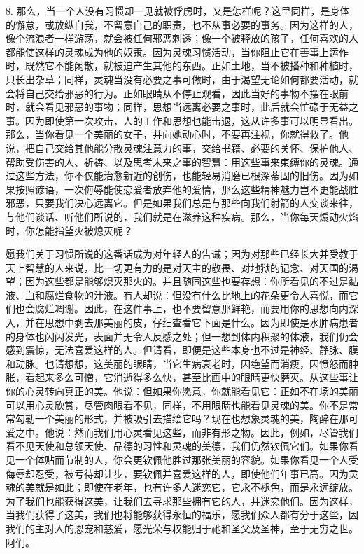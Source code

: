 8. 那么，当一个人没有习惯却一见就被俘虏时，又是怎样呢？这里同样，是身体的懈怠，或放纵自我，不留意自己的职责，也不从事必要的事务。因为这样的人，像个流浪者一样游荡，就会被任何邪恶刺透；像一个被释放的孩子，任何喜欢的人都能使这样的灵魂成为他的奴隶。因为灵魂习惯活动，当你阻止它在善事上运作时，既然它不能闲散，就被迫产生其他的东西。正如土地，当不被播种和种植时，只长出杂草；同样，灵魂当没有必要之事可做时，由于渴望无论如何都要活动，就会将自己交给邪恶的行为。正如眼睛从不停止观看，因此当好的事物不摆在眼前时，就会看见邪恶的事物；同样，思想当远离必要之事时，此后就会忙碌于无益之事。因为即使第一次攻击，人的工作和思想也能击退，这从许多事可以明显看出。那么，当你看见一个美丽的女子，并向她动心时，不要再注视，你就得救了。他说，把自己交给其他能分散灵魂注意力的事，交给书籍、必要的关怀、保护他人、帮助受伤害的人、祈祷、以及思考未来之事的智慧：用这些事来束缚你的灵魂。通过这些方法，你不仅能治愈新近的创伤，也能轻易消磨已根深蒂固的旧伤。因为如果按照谚语，一次侮辱能使恋爱者放弃他的爱情，那么这些精神魅力岂不更能战胜邪恶，只要我们决心远离它。但是如果我们总是与那些向我们射箭的人交谈来往，与他们谈话、听他们所说的，我们就是在滋养这种疾病。那么，当你每天煽动火焰时，你怎能指望火被熄灭呢？\par

愿我们关于习惯所说的这番话成为对年轻人的告诫；因为对那些已经长大并受教于天上智慧的人来说，比一切更有力的是对天主的敬畏、对地狱的记念、对天国的渴望；因为这些都是能够熄灭那火的。并且随同这些也要存想：你所看见的不过是黏液、血和腐烂食物的汁液。有人却说：但没有什么比地上的花朵更令人喜悦，而它们也会腐烂凋谢。因此，在这件事上，也不要留意那鲜艳，而要用你的思想向内深入，并在思想中剥去那美丽的皮，仔细查看它下面是什么。因为即使是水肿病患者的身体也闪闪发光，表面并无令人反感之处；但一想到体内积聚的体液，我们仍会感到震惊，无法喜爱这样的人。但请看，即便是这些本身也不过是神经、静脉、膜和动脉。也请想想，这美丽的眼睛，当它生病衰老时，因绝望而消瘦，因愤怒而肿胀，看起来多么可憎，它消逝得多么快，甚至比画中的眼睛更快磨灭。从这些事让你的心灵转向真正的美。他说：但如果你愿意，你就能看见它：正如不在场的美丽可以用心灵欣赏，尽管肉眼看不见，同样，不用眼睛也能看见灵魂的美。你不是常常勾勒一个美丽的形式，并被吸引去描绘它吗？现在也想象灵魂的美，陶醉在那可爱之中。他说：然而我们用心灵看见这些，而非有形之物。因此，例如，尽管我们看不见天使和总领天使、品德的习性和灵魂的美德，我们仍然钦佩它们。如果你看见一个体贴而节制的人，你会更钦佩他胜过那张美丽的容貌。如果你看见一个人受侮辱却忍受，被亏待却让步，要钦佩并喜爱这样的人，即使他们年事已高。因为灵魂的美就是如此；即使在老年，也有许多人迷恋它，它永不褪色，而是永远绽放。为了我们也能获得这美，让我们去寻求那些拥有它的人，并迷恋他们。因为这样，当我们获得了这美，我们也将能够获得永恒的福乐，愿我们众人都有分于这些，因我们的主对人的恩宠和慈爱，愿光荣与权能归于祂和圣父及圣神，至于无穷之世。阿们。\par

